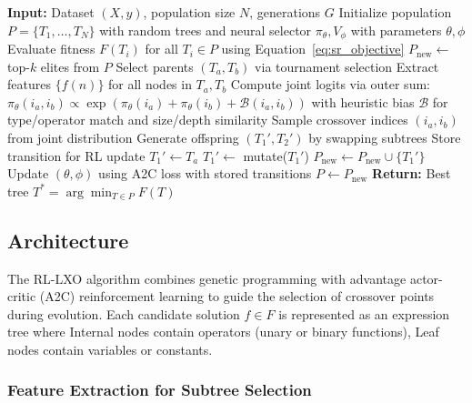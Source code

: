 \documentclass{article}
\begin{document}
\begin{algorithm}[H]
\caption{}
\label{rlalg}
\begin{algorithmic}[1]
\caption{RL-LXO for Symbolic Regression}
\State \textbf{Input:} Dataset $(X, y)$, population size $N$, generations $G$
\State Initialize population ${P} = \{T_1, \ldots, T_N\}$ with random trees and neural selector $\pi_{\theta}, V_{\phi}$ with parameters $\theta, \phi$
    \State Evaluate fitness $F(T_i)$ for all $T_i \in {P}$ using Equation~\ref{eq:sr_objective}
    \State ${P}_{\text{new}} \gets$ top-$k$ elites from ${P}$
        \State Select parents $(T_a, T_b)$ via tournament selection
        \State Extract features $\{{f}(n)\}$ for all nodes in $T_a, T_b$
        \State Compute joint logits via outer sum: $\pi_{\theta}(i_a, i_b) \propto \exp(\pi_{\theta}(i_a) + \pi_{\theta}(i_b) + \mathcal{B}(i_a, i_b))$ with heuristic bias $\mathcal{B}$ for type/operator match and size/depth similarity
        \State Sample crossover indices $(i_a, i_b)$ from joint distribution
        \State Generate offspring $(T_1', T_2')$ by swapping subtrees
            \State Store transition for RL update
        \Else
            \State $T_1' \gets T_a$
        \EndIf
            \State $T_1' \gets$ mutate($T_1'$) 
        \EndIf
        \State ${P}_{\text{new}} \gets {P}_{\text{new}} \cup \{T_1'\}$
    \EndWhile
        \State Update $(\theta, \phi)$ using A2C loss with stored transitions
    \EndIf
    \State ${P} \gets {P}_{\text{new}}$
\EndFor
\State \textbf{Return:} Best tree $T^* = \arg\min_{T \in {P}} F(T)$
\end{algorithmic}
\end{algorithm}

\subsection{Architecture}

The RL-LXO algorithm combines genetic programming with advantage actor-critic (A2C) reinforcement learning to guide the selection of crossover points during evolution.
Each candidate solution $f \in {F}$ is represented as an expression tree where Internal nodes contain operators (unary or binary functions), Leaf nodes contain variables or constants.

\subsubsection*{Feature Extraction for Subtree Selection}
\end{document}
